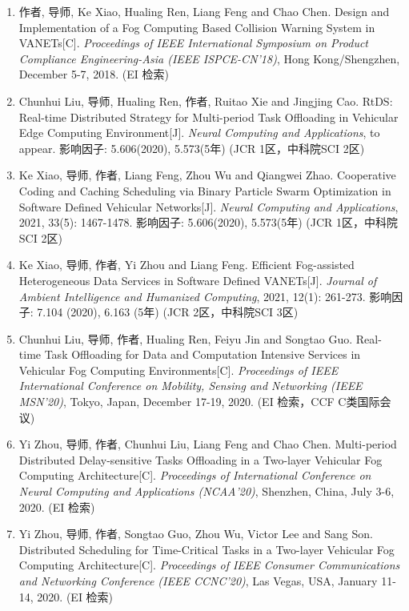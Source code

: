 \begin{enumerate}
	\item 作者\textbf{}, 导师, Ke Xiao, Hualing Ren, Liang Feng and Chao Chen. Design and Implementation of a Fog Computing Based Collision Warning System in VANETs[C]. \textit{Proceedings of IEEE International Symposium on Product Compliance Engineering-Asia (IEEE ISPCE-CN’18)}, Hong Kong/Shengzhen, December 5-7, 2018. (EI 检索)
	\item Chunhui Liu, 导师, Hualing Ren, 作者\textbf{}, Ruitao Xie and Jingjing Cao. RtDS: Real-time Distributed Strategy for Multi-period Task Offloading in Vehicular Edge Computing Environment[J]. \textit{Neural Computing and Applications}, to appear. 影响因子: 5.606(2020), 5.573(5年) (JCR 1区，中科院SCI 2区)
	\item Ke Xiao, 导师, 作者\textbf{}, Liang Feng, Zhou Wu and Qiangwei Zhao. Cooperative Coding and Caching Scheduling via Binary Particle Swarm Optimization in Software Defined Vehicular Networks[J]. \textit{Neural Computing and Applications}, 2021, 33(5): 1467-1478. 影响因子: 5.606(2020), 5.573(5年) (JCR 1区，中科院SCI 2区)
	\item Ke Xiao, 导师, 作者\textbf{}, Yi Zhou and Liang Feng. Efficient Fog-assisted Heterogeneous Data Services in Software Defined VANETs[J]. \textit{Journal of Ambient Intelligence and Humanized Computing}, 2021, 12(1): 261-273. 影响因子: 7.104 (2020), 6.163 (5年) (JCR 2区，中科院SCI 3区)
	\item Chunhui Liu, 导师, 作者\textbf{}, Hualing Ren, Feiyu Jin and Songtao Guo. Real-time Task Offloading for Data and Computation Intensive Services in Vehicular Fog Computing Environments[C]. \textit{Proceedings of IEEE International Conference on Mobility, Sensing and Networking (IEEE MSN’20)}, Tokyo, Japan, December 17-19, 2020. (EI 检索，CCF C类国际会议)
	\item Yi Zhou, 导师, 作者\textbf{}, Chunhui Liu, Liang Feng and Chao Chen. Multi-period Distributed Delay-sensitive Tasks Offloading in a Two-layer Vehicular Fog Computing Architecture[C]. \textit{Proceedings of International Conference on Neural Computing and Applications (NCAA’20)}, Shenzhen, China, July 3-6, 2020. (EI 检索)
	\item Yi Zhou, 导师, 作者\textbf{}, Songtao Guo, Zhou Wu, Victor Lee and Sang Son. Distributed Scheduling for Time-Critical Tasks in a Two-layer Vehicular Fog Computing Architecture[C]. \textit{Proceedings of IEEE Consumer Communications and Networking Conference (IEEE CCNC’20)}, Las Vegas, USA, January 11-14, 2020. (EI 检索)
\end{enumerate}

